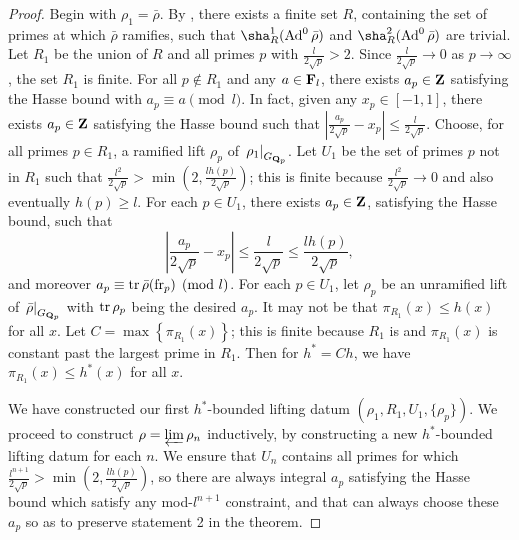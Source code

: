 \begin{proof}
Begin with $\rho_1= \bar\rho$. By \cite[Lem.~6]{khare-larsen-ramakrishna-2005}, 
there exists a finite set $R$, containing the set of primes at which $\bar\rho$ 
ramifies, such that $\sha_R^1(\Ad^0\bar\rho)$ and $\sha_R^2(\Ad^0\bar\rho)$ are 
trivial. 
Let $R_1$ be the union of $R$ and all primes $p$ with 
$\frac{l}{2\sqrt p} > 2$. Since $\frac{l}{2\sqrt p} \to 0$ as $p\to \infty$, 
the set $R_1$ is finite. For all $p\notin R_1$ and any $a\in \mathbf{F}_l$, there 
exists $a_p\in \mathbf{Z}$ satisfying the Hasse bound with $a_p\equiv a\pmod l$. In 
fact, given any $x_p\in [-1,1]$, there exists $a_p\in \mathbf{Z}$ satisfying the Hasse 
bound such that 
$\left| \frac{a_p}{2\sqrt p} - x_p\right| \leqslant \frac{l}{2\sqrt p}$.
Choose, for all primes $p\in R_1$, a ramified 
lift $\rho_p$ of $\left. \rho_1\right|_{G_{\mathbf{Q}_p}}$. Let $U_1$ be the set of 
primes $p$ not in $R_1$ such that 
$\frac{l^2}{2\sqrt p} > \min\left(2, \frac{l h(p)}{2\sqrt p}\right)$; this is 
finite because $\frac{l^2}{2\sqrt p} \to 0$ and also eventually 
$h(p) \geqslant l$. 
For each $p\in U_1$, there exists $a_p\in \mathbf{Z}$, satisfying the 
Hasse bound, such that 
\[
	\left| \frac{a_p}{2\sqrt p} - x_p\right| \leqslant \frac{l}{2\sqrt p} \leqslant \frac{l h(p)}{2\sqrt p} ,
\]
and moreover $a_p\equiv \operatorname{tr}\bar\rho(\mathrm{fr}_p)\pmod l$. For each $p\in U_1$, let 
$\rho_p$ be an unramified lift of $\left.\bar\rho\right|_{G_{\mathbf{Q}_p}}$ with 
$\operatorname{tr}\rho_p$ being the desired $a_p$. It may not be that 
$\pi_{R_1}(x) \leqslant h(x)$ for all $x$. Let 
$C = \max\left\{\pi_{R_1}(x)\right\}$; this is finite because 
$R_1$ is and $\pi_{R_1}(x)$ is constant past the largest prime in $R_1$. Then 
for $h^\ast = C h$, we have $\pi_{R_1}(x) \leqslant h^\ast(x)$ for all $x$. 

We have constructed our first $h^\ast$-bounded lifting datum 
$(\rho_1,R_1,U_1,\{\rho_p\})$. We proceed to construct 
$\rho = \varprojlim \rho_n$ inductively, by constructing a new $h^\ast$-bounded 
lifting datum for each $n$. We ensure that $U_n$ contains all primes for which 
$\frac{l^{n+1}}{2\sqrt p} > \min\left(2, \frac{l h(p)}{2\sqrt p}\right)$, so 
there are always integral $a_p$ satisfying the Hasse bound which satisfy any 
mod-$l^{n+1}$ constraint, and that can always choose these $a_p$ so as to 
preserve statement 2 in the theorem. 


\end{proof}
